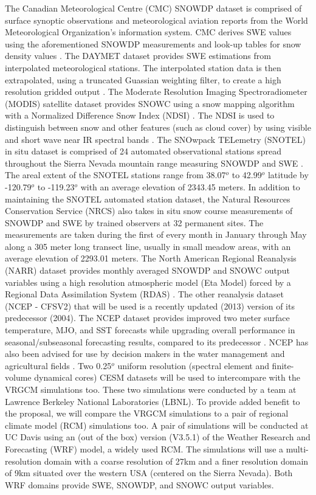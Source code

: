 \documentclass[11pt]{article}
\begin{document}
The Canadian Meteorological Centre (CMC) SNOWDP dataset is comprised of surface synoptic observations and meteorological aviation reports from the World Meteorological Organization’s information system.  CMC derives SWE values using the aforementioned SNOWDP measurements and look-up tables for snow density values \citep{brown2003gridded}.  The DAYMET dataset provides SWE estimations from interpolated meteorological stations.  The interpolated station data is then extrapolated, using a truncated Guassian weighting filter, to create a high resolution gridded output \citep{thornton2012daymet}.  The Moderate Resolution Imaging Spectroradiometer (MODIS) satellite dataset provides SNOWC using a snow mapping algorithm with a Normalized Difference Snow Index (NDSI) \citep{salomonson2006development}.  The NDSI is used to distinguish between snow and other features (such as cloud cover) by using visible and short wave near IR spectral bands \citep{salomonson2006development}.  The SNOwpack TELemetry (SNOTEL) in situ dataset is comprised of 24 automated observational stations spread throughout the Sierra Nevada mountain range measuring SNOWDP and SWE \citep{serreze1999characteristics}.  The areal extent of the SNOTEL stations range from 38.07$^{o}$ to 42.99$^{o}$ latitude by -120.79$^{o}$ to -119.23$^{o}$ with an average elevation of 2343.45 meters.  In addition to maintaining the SNOTEL automated station dataset, the Natural Resources Conservation Service (NRCS) also takes in situ snow course measurements of SNOWDP and SWE by trained observers at 32 permanent sites.  The measurements are taken during the first of every month in January through May along a 305 meter long transect line, usually in small meadow areas, with an average elevation of 2293.01 meters.  The North American Regional Reanalysis (NARR) dataset provides monthly averaged SNOWDP and SNOWC output variables using a high resolution atmospheric model (Eta Model) forced by a Regional Data Assimilation System (RDAS) \citep{mesinger2006north}.  The other reanalysis dataset (NCEP - CFSV2) that will be used is a recently updated (2013) version of its predecessor (2004).  The NCEP dataset provides improved two meter surface temperature, MJO, and SST forecasts while upgrading overall performance in seasonal/subseasonal forecasting results, compared to its predecessor \citep{saha2014ncep}. NCEP has also been advised for use by decision makers in the water management and agricultural fields \citep{saha2014ncep}.  Two 0.25$^{o}$ uniform resolution (spectral element and finite-volume dynamical cores) CESM datasets will be used to intercompare with the VRGCM simulations too.  These two simulations were conducted by a team at Lawrence Berkeley National Laboratories (LBNL). To provide added benefit to the proposal, we will compare the VRGCM simulations to a pair of regional climate model (RCM) simulations too.  A pair of simulations will be conducted at UC Davis using an (out of the box) version (V3.5.1) of the Weather Research and Forecasting (WRF) model, a widely used RCM.  The simulations will use a multi-resolution domain with a coarse resolution of 27km and a finer resolution domain of 9km situated over the western USA (centered on the Sierra Nevada).  Both WRF domains provide SWE, SNOWDP, and SNOWC output variables.
\end{document}
